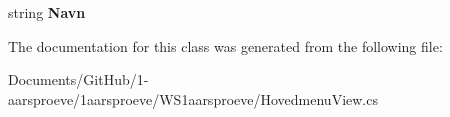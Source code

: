 \begin{DoxyCompactItemize}
\item 
\hypertarget{class_w_s1aarsproeve_1_1_hovedmenu_view_ac3d16cb75d2dd7028acfeb1b1b6ad5e9}{}string {\bfseries Navn}\label{class_w_s1aarsproeve_1_1_hovedmenu_view_ac3d16cb75d2dd7028acfeb1b1b6ad5e9}

\end{DoxyCompactItemize}


The documentation for this class was generated from the following file\+:\begin{DoxyCompactItemize}
\item 
Documents/\+Git\+Hub/1-\/aarsproeve/1aarsproeve/\+W\+S1aarsproeve/Hovedmenu\+View.\+cs\end{DoxyCompactItemize}

